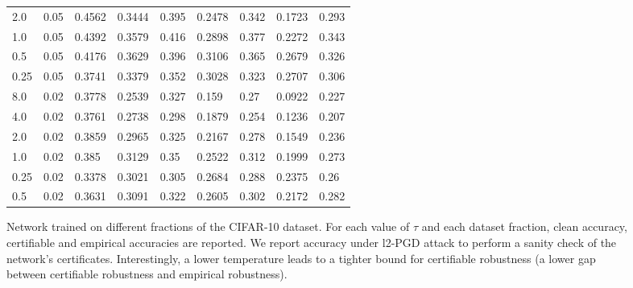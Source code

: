 \begin{figure}
\begin{tabular}{llp{1.2cm}p{1.2cm}p{1.2cm}p{1.2cm}p{1.2cm}p{1.2cm}p{1.2cm}}
               2.0 &      0.05 &   0.4562 &          0.3444 &      0.395 &          0.2478 &      0.342 &           0.1723 &       0.293 \\
               1.0 &      0.05 &   0.4392 &          0.3579 &      0.416 &          0.2898 &      0.377 &           0.2272 &       0.343 \\
               0.5 &      0.05 &   0.4176 &          0.3629 &      0.396 &          0.3106 &      0.365 &           0.2679 &       0.326 \\
              0.25 &      0.05 &   0.3741 &          0.3379 &      0.352 &          0.3028 &      0.323 &           0.2707 &       0.306 \\
               8.0 &      0.02 &   0.3778 &          0.2539 &      0.327 &           0.159 &       0.27 &           0.0922 &       0.227 \\
               4.0 &      0.02 &   0.3761 &          0.2738 &      0.298 &          0.1879 &      0.254 &           0.1236 &       0.207 \\
               2.0 &      0.02 &   0.3859 &          0.2965 &      0.325 &          0.2167 &      0.278 &           0.1549 &       0.236 \\
               1.0 &      0.02 &    0.385 &          0.3129 &       0.35 &          0.2522 &      0.312 &           0.1999 &       0.273 \\
              0.25 &      0.02 &   0.3378 &          0.3021 &      0.305 &          0.2684 &      0.288 &           0.2375 &        0.26 \\
               0.5 &      0.02 &   0.3631 &          0.3091 &      0.322 &          0.2605 &      0.302 &           0.2172 &       0.282 \\
            \hline
        \end{tabular}
        \caption{Network trained on different fractions of the CIFAR-10 dataset. For each value of $\tau$ and each dataset fraction, clean accuracy, certifiable and empirical accuracies are reported. We report accuracy under l2-PGD attack to perform a sanity check of the network's certificates. Interestingly, a lower temperature leads to a tighter bound for certifiable robustness (a lower gap between certifiable robustness and empirical robustness).}
        \label{fig:consitency-results}
    \end{figure}
    

